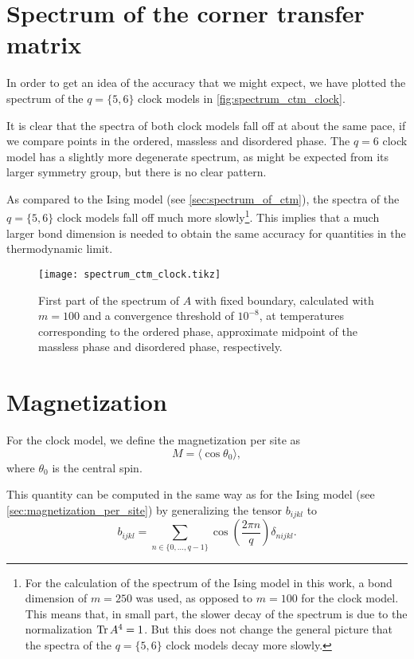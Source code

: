\section{Spectrum of the corner transfer matrix}

In order to get an idea of the accuracy that we might expect, we have plotted the spectrum of the $q = \{5,
6\}$ clock models in \autoref{fig:spectrum_ctm_clock}.

It is clear that the spectra of both clock models fall off at about the same pace,
if we compare points in the ordered, massless and disordered phase.
The $q = 6$ clock model has a slightly more degenerate spectrum, as might be expected from its larger symmetry group,
but there is no clear pattern.

As compared to the Ising model (see \autoref{sec:spectrum_of_ctm}), the spectra of the $q = \{5,
6\}$ clock models fall off much more slowly\footnote{For the calculation of the spectrum of the Ising model in this
work, a bond dimension of $m = 250$ was used, as opposed to $m = 100$ for the clock model.
This means that, in small part, the slower decay of the spectrum is due to the normalization $\operatorname{Tr} A^4 = 1$.
But this does not change the general picture that the spectra of the $q = \{5,
6\}$ clock models decay more slowly.}.
This implies that a much larger bond dimension is needed to obtain the same accuracy for quantities in the thermodynamic
limit.

\begin{figure}
  \texttt{[image: spectrum\_ctm\_clock.tikz]}
  \caption{First part of the spectrum of $A$ with fixed boundary,
  calculated with $m = 100$ and a convergence threshold of $10^{-8}$,
  at temperatures corresponding to the ordered phase, approximate midpoint of the massless phase and disordered phase,
  respectively.}\label{fig:spectrum_ctm_clock}
\end{figure}

\section{Magnetization}

For the clock model, we define the magnetization per site as
\begin{equation}\label{eq:magnetization_clock_model}
  M = \langle \cos \theta_0 \rangle,
\end{equation}
where $\theta_0$ is the central spin.

This quantity can be computed in the same way as for the Ising model (see \autoref{sec:magnetization_per_site}) by
generalizing the tensor $b_{i j k l}$ to
\begin{equation}
  b_{i j k l} = \sum_{n \in \{ 0, \dots, q-1 \}} \cos \left( \frac{2\pi n}{q} \right) \delta_{n i j k l}.
\end{equation}

